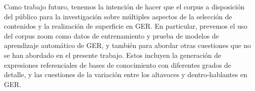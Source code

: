 Como trabajo futuro, tenemos la intenci\'on de hacer que el corpus a disposici\'on del p\'ublico para la investigaci\'on sobre m\'ultiples aspectos de la selecci\'on de contenidos y la realizaci\'on de superficie en GER. En particular, prevemos el uso del corpus zoom como datos de entrenamiento y prueba de modelos de aprendizaje autom\'atico de GER, y tambi\'en para abordar otras cuestiones que no se han abordado en el presente trabajo. Estos incluyen la generaci\'on de expresiones referenciales de bases de conocimiento con diferentes grados de detalle, y las cuestiones de la variaci\'on entre los altavoces y dentro-hablantes en GER.

